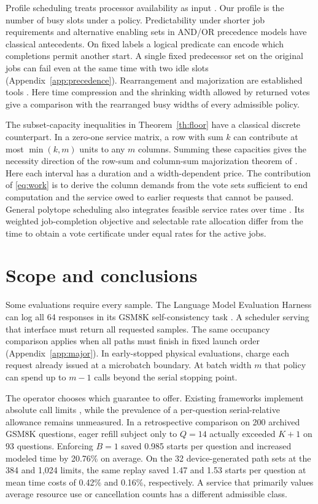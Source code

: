 Profile scheduling treats processor availability as input \citep{dolev1985profile,liu1997variable,liu1995det}. Our profile is the number of busy slots under a policy. Predictability under shorter job requirements \citep{cucu2010} and alternative enabling sets in AND/OR precedence models \citep{moehring2004} have classical antecedents. On fixed labels a logical predicate can encode which completions permit another start. A single fixed predecessor set on the original jobs can fail even at the same time with two idle slots (Appendix~\ref{app:precedence}). Rearrangement and majorization are established tools \citep{chang1993rearrangement}. Here time compression and the shrinking width allowed by returned votes give a comparison with the rearranged busy widths of every admissible policy.

The subset-capacity inequalities in Theorem~\ref{th:floor} have a classical discrete counterpart. In a zero-one service matrix, a row with sum \(k\) can contribute at most \(\min(k,m)\) units to any \(m\) columns. Summing these capacities gives the necessity direction of the row-sum and column-sum majorization theorem of \citet[Thm.~2.1]{ryser1957}. Here each interval has a duration and a width-dependent price. The contribution of \eqref{eq:work} is to derive the column demands from the vote sets sufficient to end computation and the service owed to earlier requests that cannot be paused. General polytope scheduling also integrates feasible service rates over time \citep{jaeger2025}. Its weighted job-completion objective and selectable rate allocation differ from the time to obtain a vote certificate under equal rates for the active jobs.

\section{Scope and conclusions}
Some evaluations require every sample. The Language Model Evaluation Harness can log all 64 responses in its GSM8K self-consistency task \citep{eleuther2024gsm64}. A scheduler serving that interface must return all requested samples. The same occupancy comparison applies when all paths must finish in fixed launch order (Appendix~\ref{app:major}). In early-stopped physical evaluations, \citet[App.~H.4]{recover} charge each request already issued at a microbatch boundary. At batch width $m$ that policy can spend up to $m-1$ calls beyond the serial stopping point.

The operator chooses which guarantee to offer. Existing frameworks implement absolute call limits \citep{pydanticlimit,langchainlimit}, while the prevalence of a per-question serial-relative allowance remains unmeasured. In a retrospective comparison on 200 archived GSM8K questions, eager refill subject only to $Q=14$ actually exceeded $K+1$ on 93 questions. Enforcing $B=1$ saved 0.985 starts per question and increased modeled time by 20.76\% on average. On the 32 device-generated path sets at the 384 and 1,024 limits, the same replay saved 1.47 and 1.53 starts per question at mean time costs of 0.42\% and 0.16\%, respectively. A service that primarily values average resource use or cancellation counts has a different admissible class.

